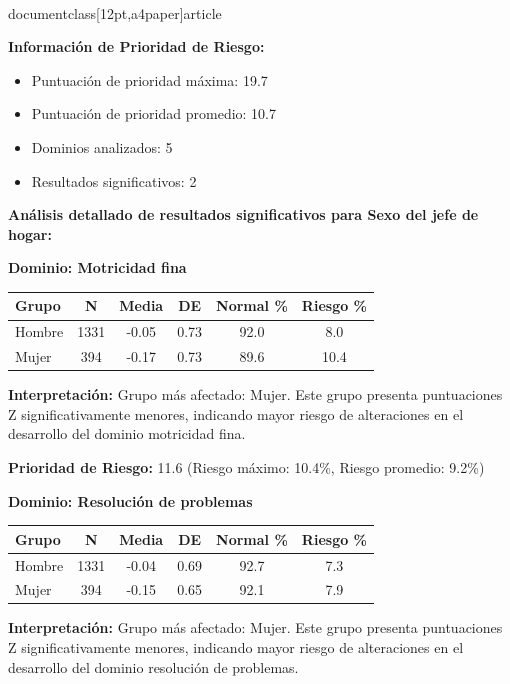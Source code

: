 \\documentclass[12pt,a4paper]{article}
\begin{document}
\textbf{Información de Prioridad de Riesgo:}
\begin{itemize}
\item Puntuación de prioridad máxima: 19.7
\item Puntuación de prioridad promedio: 10.7
\item Dominios analizados: 5
\item Resultados significativos: 2
\end{itemize}


\textbf{Análisis detallado de resultados significativos para Sexo del jefe de hogar:}


\textbf{Dominio: Motricidad fina}


\begin{center}
\begin{tabular}{|l|c|c|c|c|c|}
\hline
\textbf{Grupo} & \textbf{N} & \textbf{Media} & \textbf{DE} & \textbf{Normal \%} & \textbf{Riesgo \%} \\
\hline
Hombre & 1331 & -0.05 & 0.73 & 92.0 & 8.0 \\
Mujer & 394 & -0.17 & 0.73 & 89.6 & 10.4 \\

\hline
\end{tabular}
\end{center}


\textbf{Interpretación:} Grupo más afectado: Mujer. Este grupo presenta puntuaciones Z significativamente menores, indicando mayor riesgo de alteraciones en el desarrollo del dominio motricidad fina.

\textbf{Prioridad de Riesgo:} 11.6 (Riesgo máximo: 10.4\%, Riesgo promedio: 9.2\%)


\vspace{0.5cm}


\textbf{Dominio: Resolución de problemas}


\begin{center}
\begin{tabular}{|l|c|c|c|c|c|}
\hline
\textbf{Grupo} & \textbf{N} & \textbf{Media} & \textbf{DE} & \textbf{Normal \%} & \textbf{Riesgo \%} \\
\hline
Hombre & 1331 & -0.04 & 0.69 & 92.7 & 7.3 \\
Mujer & 394 & -0.15 & 0.65 & 92.1 & 7.9 \\

\hline
\end{tabular}
\end{center}


\textbf{Interpretación:} Grupo más afectado: Mujer. Este grupo presenta puntuaciones Z significativamente menores, indicando mayor riesgo de alteraciones en el desarrollo del dominio resolución de problemas.
\end{document}
